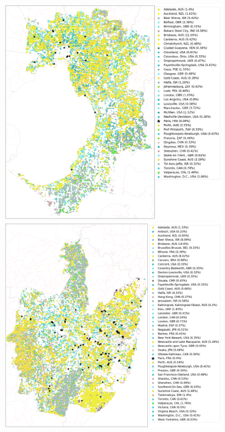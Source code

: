 \documentclass[sageh,times]{sagej}
\begin{document}
  

\begin{figure}[!htbp]
\centering    
\includegraphics[scale=0.15]{Images/MelbourneOverallAbrev_maps.png} 
\includegraphics[scale=0.15]{Images/SydneyOverallAbrev_maps.png}  

\end{figure}
\end{document}
